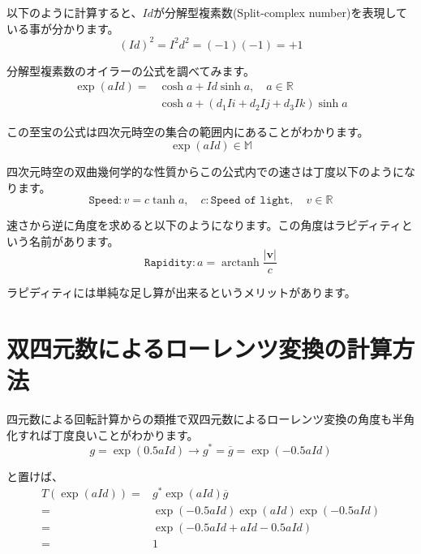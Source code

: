 \documentclass[a4paper,12pt]{jsreport}
\DeclareMathOperator\arctanh{arctanh}
\begin{document}
以下のように計算すると、$Id$が分解型複素数(Split-complex number)を表現している事が分かります。
\begin{equation}
(Id)^2=I^2d^2=(-1)(-1)=+1
\end{equation}

分解型複素数のオイラーの公式を調べてみます。
\begin{equation}
\begin{split}
\exp(aId)=&\cosh a+Id\sinh a,\quad a\in\mathbb{R}\\
&\cosh a+(d_1Ii+d_2Ij+d_3Ik)\sinh a
\end{split}
\end{equation}

この至宝の公式は四次元時空の集合の範囲内にあることがわかります。
\begin{equation}
\exp(aId)\in\mathbb{M}
\end{equation}

四次元時空の双曲幾何学的な性質からこの公式内での速さは丁度以下のようになります。
\begin{equation}
\texttt{Speed}:v=c\tanh a,\quad c:\texttt{Speed of light},\quad v\in\mathbb{R}
\end{equation}

速さから逆に角度を求めると以下のようになります。この角度はラピディティという名前があります。
\begin{equation}
\texttt{Rapidity}:a=\arctanh\frac{|\bm{v}|}{c}
\end{equation}

ラピディティには単純な足し算が出来るというメリットがあります。

\section{双四元数によるローレンツ変換の計算方法}

四元数による回転計算からの類推で双四元数によるローレンツ変換の角度も半角化すれば丁度良いことがわかります。
\begin{equation}
g=\exp(0.5aId) \to g^*=\overline{g}=\exp(-0.5aId)
\end{equation}

と置けば、
\begin{equation}
\begin{split}
T(\exp(aId))=&g^*\exp(aId)\overline{g}\\
=&\exp(-0.5aId)\exp(aId)\exp(-0.5aId)\\
=&\exp(-0.5aId+aId-0.5aId)\\
=&1
\end{split}
\end{equation}
\end{document}
